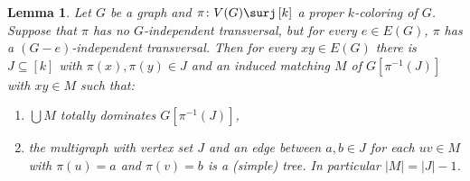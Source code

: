 \documentclass[openany]{tufte-book} %
\theoremstyle{plain}
\newtheorem{lemma}{Lemma}
\newcommand{\card}[1]{\left|#1\right|}
\newcommand{\funcsurj}[3]{#1\colon #2 \surj #3}
\newcommand{\irange}[1]{\left[#1\right]}
\newcommand{\brackets}[1]{\left[ #1 \right]}
\begin{document}
\begin{lemma}\label{BaseTransversalLemma}
Let $G$ be a graph and $\funcsurj{\pi}{V(G)}{\irange{k}}$ a proper $k$-coloring of
$G$.  Suppose that $\pi$ has no $G$-independent transversal, but for every $e
\in E(G)$, $\pi$ has a $(G-e)$-independent transversal. Then for every $xy \in
E(G)$ there is $J \subseteq \irange{k}$ with $\pi(x), \pi(y) \in J$ and an 
induced matching $M$ of $G\brackets{\pi^{-1}(J)}$ with $xy \in M$ such that:
\begin{enumerate}
  \item $\bigcup M$ totally dominates $G\brackets{\pi^{-1}(J)}$,
  \item the multigraph with vertex set $J$ and an edge between $a, b \in J$ for
  each $uv \in M$ with $\pi(u) = a$ and $\pi(v) = b$ is a (simple) tree.  In
  particular $\card{M} = \card{J} - 1$.
\end{enumerate}
\end{lemma}
\end{document}
